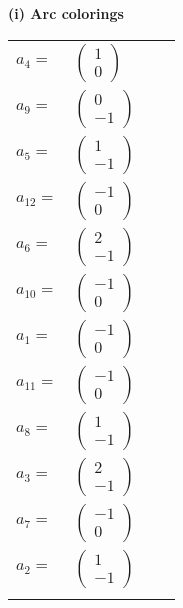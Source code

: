 \documentclass[1p]{elsarticle_modified}
\theoremstyle{definition}
\begin{document}
\flushleft \textbf{(i) Arc colorings}\\
\begin{tabular}{m{7pt} m{180pt} m{7pt} m{180pt} }
\flushright $a_{4}=$&$\begin{pmatrix}1\\0\end{pmatrix}$ \\
\flushright $a_{9}=$&$\begin{pmatrix}0\\-1\end{pmatrix}$ \\
\flushright $a_{5}=$&$\begin{pmatrix}1\\-1\end{pmatrix}$ \\
\flushright $a_{12}=$&$\begin{pmatrix}-1\\0\end{pmatrix}$ \\
\flushright $a_{6}=$&$\begin{pmatrix}2\\-1\end{pmatrix}$ \\
\flushright $a_{10}=$&$\begin{pmatrix}-1\\0\end{pmatrix}$ \\
\flushright $a_{1}=$&$\begin{pmatrix}-1\\0\end{pmatrix}$ \\
\flushright $a_{11}=$&$\begin{pmatrix}-1\\0\end{pmatrix}$ \\
\flushright $a_{8}=$&$\begin{pmatrix}1\\-1\end{pmatrix}$ \\
\flushright $a_{3}=$&$\begin{pmatrix}2\\-1\end{pmatrix}$ \\
\flushright $a_{7}=$&$\begin{pmatrix}-1\\0\end{pmatrix}$ \\
\flushright $a_{2}=$&$\begin{pmatrix}1\\-1\end{pmatrix}$\\&\end{tabular}
\end{document}
